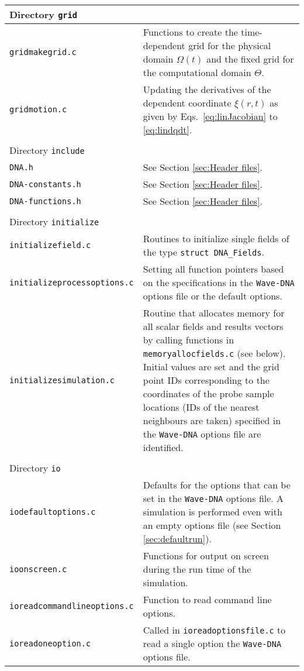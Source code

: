 \begin{longtable}{p{} p{}}
\\
\hline Directory {\tt grid} &\\ \hline
{\tt gridmakegrid.c} & Functions to create the time-dependent grid for the physical domain $\Omega\left(t\right)$ and the fixed grid for the computational domain $\Theta$. \\
{\tt gridmotion.c} & Updating the derivatives of the dependent coordinate $\xi\left(r,t\right)$ as given by Eqs.~\eqref{eq:linJacobian} to \eqref{eq:lindqdt}. \\
\\
\hline Directory {\tt include} &\\ \hline
{\tt DNA.h} & See Section \ref{sec:Header files}. \\
{\tt DNA-constants.h} & See Section \ref{sec:Header files}. \\
{\tt DNA-functions.h} & See Section \ref{sec:Header files}. \\
\\
\hline Directory {\tt initialize} &\\ \hline
{\tt initializefield.c} & Routines to initialize single fields of the type {\tt struct DNA\_Fields}. \\
{\tt initializeprocessoptions.c} & Setting all function pointers based on the specifications in the {\tt Wave-DNA} options file or the default options. \\
{\tt initializesimulation.c} & Routine that allocates memory for all scalar fields and results vectors by calling functions in {\tt memoryallocfields.c} (see below). Initial values are set and the grid point IDs corresponding to the coordinates of the probe sample locations (IDs of the nearest neighbours are taken) specified in the {\tt Wave-DNA} options file are identified. \\
\\
\hline Directory {\tt io} &\\ \hline
{\tt iodefaultoptions.c} & Defaults for the options that can be set in the {\tt Wave-DNA} options file. A simulation is performed even with an empty options file (see Section \ref{sec:defaultrun}). \\
{\tt ioonscreen.c} & Functions for output on screen during the run time of the simulation. \\
{\tt ioreadcommandlineoptions.c} & Function to read command line options. \\
{\tt ioreadoneoption.c} & Called in {\tt ioreadoptionsfile.c} to read a single option the {\tt Wave-DNA} options file. \\

\end{longtable}
